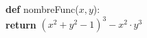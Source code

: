 \documentclass[preview]{standalone}
\begin{document}
\begin{center}
\textbf{def} nombreFunc($x, y$): \\ \hspace{8em} \textbf{return} $(x^2 + y^2 - 1)^3 - x^2 \cdot y^3$
\end{center}
\end{document}

